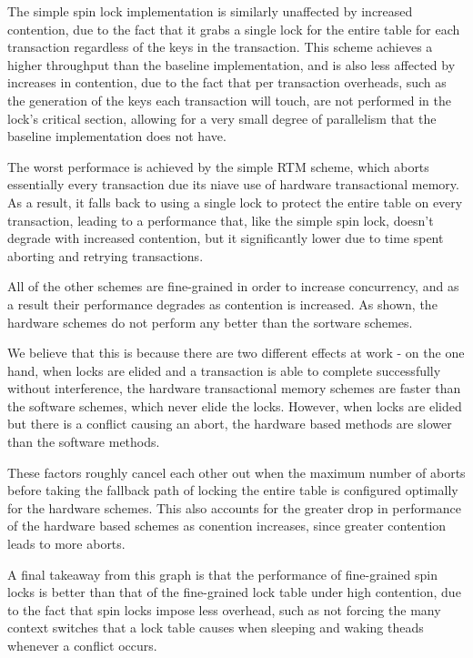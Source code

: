The simple spin lock implementation is similarly unaffected by increased
contention, due to the fact that it grabs a single lock for the entire table for
each transaction regardless of the keys in the transaction. This scheme achieves
a higher throughput than the baseline implementation, and is also less affected
by increases in contention, due to the fact that per transaction overheads, such
as the generation of the keys each transaction will touch, are not performed in
the lock's critical section, allowing for a very small degree of parallelism
that the baseline implementation does not have.

The worst performace is achieved by the simple RTM scheme, which aborts 
essentially every transaction due its niave use of hardware transactional memory. 
As a result, it falls back to using a single lock to protect the entire table on 
every transaction, leading to a performance that, like the simple spin lock, 
doesn't degrade with increased contention, but it significantly lower due to 
time spent aborting and retrying transactions.

All of the other schemes are fine-grained in order to increase concurrency, 
and as a result their performance degrades as contention is increased. As 
shown, the hardware schemes do not perform any better than the sortware 
schemes.

We believe that this is because there are two different effects at 
work - on the one hand, when locks are elided and a transaction is able to 
complete successfully without interference, the hardware transactional memory 
schemes are faster than the software schemes, which never elide the locks. 
However, when locks are elided but there is a conflict causing an abort, 
the hardware based methods are slower than the software methods.

These factors roughly cancel each other out when the maximum number of aborts 
before taking the fallback path of locking the entire table is configured 
optimally for the hardware schemes. This also accounts for the greater drop in 
performance of the hardware based schemes as conention increases, since greater 
contention leads to more aborts.

A final takeaway from this graph is that the performance of fine-grained spin 
locks is better than that of the fine-grained lock table under high contention, 
due to the fact that spin locks impose less overhead, such as not forcing the 
many context switches that a lock table causes when sleeping and waking theads 
whenever a conflict occurs.

